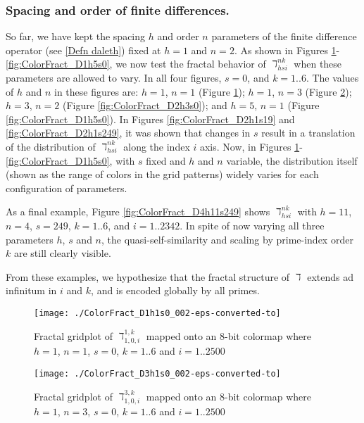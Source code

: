 \documentclass[12pt,longtitle,times]{amsart}
\begin{document}
\subsubsection[short]{Spacing and order of finite differences.}
So far, we have kept the spacing $h$ and order $n$ parameters of the finite difference operator (see \eqref{Defn daleth}) fixed at $h=1$ and $n=2$. As shown in Figures \ref{fig:ColorFract_D1h1s0}-\ref{fig:ColorFract_D1h5s0}, we now test the fractal behavior of $\daleth_{hsi}^{nk}$ when these parameters are allowed to vary. In all four figures, $s=0$, and $k=1..6$. The values of $h$ and $n$ in these figures are: $h=1$, $n=1$ (Figure \ref{fig:ColorFract_D1h1s0}); $h=1$, $n=3$ (Figure \ref{fig:ColorFract_D3h1s0}); $h=3$, $n=2$ (Figure \ref{fig:ColorFract_D2h3s0}); and $h=5$, $n=1$ (Figure \ref{fig:ColorFract_D1h5s0}). In Figures \ref{fig:ColorFract_D2h1s19} and \ref{fig:ColorFract_D2h1s249}, it was shown that changes in $s$ result in a translation of the distribution of $\daleth_{hsi}^{nk}$ along the index $i$ axis. Now, in Figures \ref{fig:ColorFract_D1h1s0}-\ref{fig:ColorFract_D1h5s0}, with $s$ fixed and $h$ and $n$ variable, the distribution itself (shown as the range of colors in the grid patterns) widely varies for each configuration of parameters. 

As a final example, Figure \ref{fig:ColorFract_D4h11s249} shows $\daleth_{hsi}^{nk}$ with $h=11$, $n=4$, $s=249$, $k=1..6$, and $i=1..2342$. In spite of now varying all three parameters $h$, $s$ and $n$, the quasi-self-similarity and scaling by prime-index order $k$ are still clearly visible. 

From these examples, we hypothesize that the fractal structure of $\daleth$ extends ad infinitum in $i$ and $k$, and is encoded globally by all primes.

\begin{figure}
\centering
\texttt{[image: ./ColorFract\_D1h1s0\_002-eps-converted-to]}
\caption{Fractal gridplot of $\daleth_{1,0,i}^{1,k}$ mapped onto an 8-bit colormap where $h=1$, $n=1$, $s=0$, $k=1..6$ and $i=1..2500$}
\label{fig:ColorFract_D1h1s0}
\end{figure}

\begin{figure}[p]
\centering
\texttt{[image: ./ColorFract\_D3h1s0\_002-eps-converted-to]}
\caption{Fractal gridplot of $\daleth_{1,0,i}^{3,k}$ mapped onto an 8-bit colormap where $h=1$, $n=3$, $s=0$, $k=1..6$ and $i=1..2500$}
\label{fig:ColorFract_D3h1s0}
\end{figure}
\end{document}
